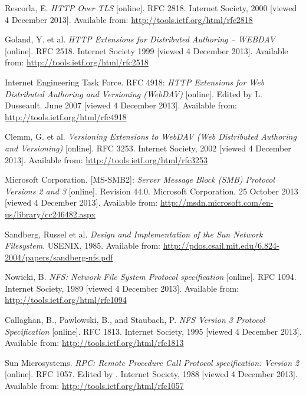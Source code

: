 \begin{thebibliography}{99}
	{\sc Rescorla,} E.
	\emph{HTTP Over TLS}
	[online].
	RFC 2818.
	Internet Society, 2000 [viewed 4 December 2013].
	Available from: \newline \url{http://tools.ietf.org/html/rfc2818}

	{\sc Goland,} Y. et al.
	\emph{HTTP Extensions for Distributed Authoring -- WEBDAV}
	[online].
	RFC 2518.
	Internet Society 1999 [viewed 4 December 2013].
	Available from: \url{http://tools.ietf.org/html/rfc2518}

	{\sc Internet Engineering Task Force}.
	RFC 4918:
	\emph{HTTP Extensions for Web Distributed Authoring and Versioning (WebDAV)}
	[online].
	Edited by L. Dusseault.
	June 2007 [viewed 4 December 2013].
	Available from: \url{http://tools.ietf.org/html/rfc4918}

	{\sc Clemm,} G. et al.
	\emph{Versioning Extensions to WebDAV (Web Distributed Authoring and Versioning)}
	[online].
	RFC 3253.
	Internet Society, 2002 [viewed 4 December 2013].
	Available from: \url{http://tools.ietf.org/html/rfc3253}

	{\sc Microsoft Corporation}.
	[MS-SMB2]:
	\emph{Server Message Block (SMB) Protocol Versions 2 and 3}
	[online].
	Revision 44.0.
	Microsoft Corporation, 25 October 2013 [viewed 4 December 2013].
	Available from: \url{http://msdn.microsoft.com/en-us/library/cc246482.aspx}

	{\sc Sandberg,} Russel et al.
	\emph {Design and Implementation of the Sun Network Filesystem}.
	USENIX, 1985.
	Available from: \newline \url{http://pdos.csail.mit.edu/6.824-2004/papers/sandberg-nfs.pdf}

	{\sc Nowicki,} B.
	\emph{NFS: Network File System Protocol specification}
	[online].
	RFC 1094.
	Internet Society, 1989 [viewed 4 December 2013].
	Available from: \url{http://tools.ietf.org/html/rfc1094}

	{\sc Callaghan,} B., {\sc Pawlowski,} B., and {\sc Staubach}, P.
	\emph{NFS Version 3 Protocol Specification}
	[online].
	RFC 1813.
	Internet Society, 1995 [viewed 4 December 2013].
	Available from: \url{http://tools.ietf.org/html/rfc1813}

	{\sc Sun Microsystems}.
	\emph{RPC: Remote Procedure Call Protocol specification: Version 2}
	[online].
	RFC 1057.
	Edited by .
	Internet Society, 1988 [viewed 4 December 2013].
	Available from: \url{http://tools.ietf.org/html/rfc1057}


\end{thebibliography}
